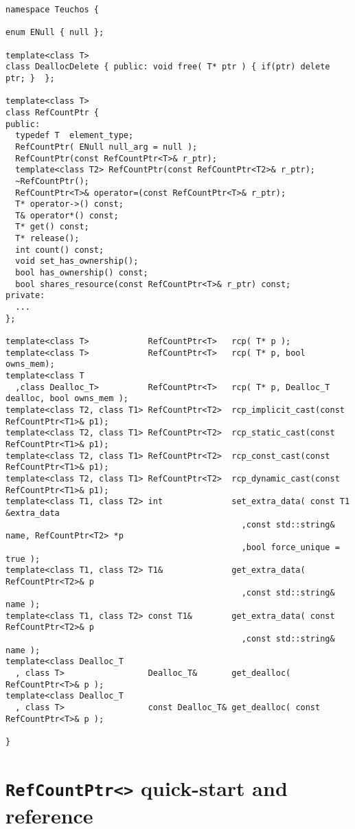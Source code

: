 \documentclass[pdf,ps2pdf,11pt]{SANDreport}
\begin{document}
{\scriptsize\begin{verbatim}
namespace Teuchos {

enum ENull { null };

template<class T>
class DeallocDelete { public: void free( T* ptr ) { if(ptr) delete ptr; }  };

template<class T>
class RefCountPtr {
public:
  typedef T  element_type;
  RefCountPtr( ENull null_arg = null );
  RefCountPtr(const RefCountPtr<T>& r_ptr);
  template<class T2> RefCountPtr(const RefCountPtr<T2>& r_ptr);
  ~RefCountPtr();
  RefCountPtr<T>& operator=(const RefCountPtr<T>& r_ptr);
  T* operator->() const;
  T& operator*() const;
  T* get() const;
  T* release();
  int count() const;
  void set_has_ownership();
  bool has_ownership() const;
  bool shares_resource(const RefCountPtr<T>& r_ptr) const;
private:
  ...
};

template<class T>            RefCountPtr<T>   rcp( T* p );
template<class T>            RefCountPtr<T>   rcp( T* p, bool owns_mem);
template<class T
  ,class Dealloc_T>          RefCountPtr<T>   rcp( T* p, Dealloc_T dealloc, bool owns_mem );
template<class T2, class T1> RefCountPtr<T2>  rcp_implicit_cast(const RefCountPtr<T1>& p1);
template<class T2, class T1> RefCountPtr<T2>  rcp_static_cast(const RefCountPtr<T1>& p1);
template<class T2, class T1> RefCountPtr<T2>  rcp_const_cast(const RefCountPtr<T1>& p1);
template<class T2, class T1> RefCountPtr<T2>  rcp_dynamic_cast(const RefCountPtr<T1>& p1);
template<class T1, class T2> int              set_extra_data( const T1 &extra_data
                                                ,const std::string& name, RefCountPtr<T2> *p
                                                ,bool force_unique = true );
template<class T1, class T2> T1&              get_extra_data( RefCountPtr<T2>& p
                                                ,const std::string& name );
template<class T1, class T2> const T1&        get_extra_data( const RefCountPtr<T2>& p
                                                ,const std::string& name );
template<class Dealloc_T
  , class T>                 Dealloc_T&       get_dealloc( RefCountPtr<T>& p );
template<class Dealloc_T
  , class T>                 const Dealloc_T& get_dealloc( const RefCountPtr<T>& p );

}
\end{verbatim}}

%
\section{\texttt{RefCountPtr<>} quick-start and reference}
\label{rcpqs:apdx:quickstart}
%
\end{document}
